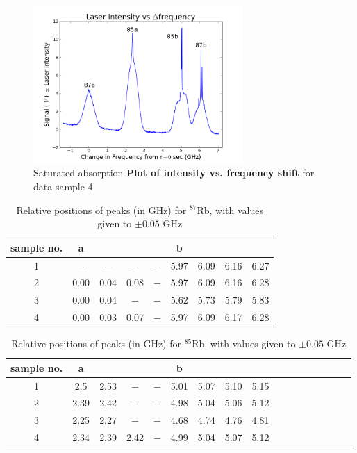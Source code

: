\documentclass[paper=a4, fontsize=11pt]{scrartcl} %
\numberwithin{equation}{section}
\numberwithin{figure}{section}
\numberwithin{table}{section}
\begin{document}
\begin{figure}[h] \begin{center}
  \includegraphics[height=60mm]{4-2-012.png}
  \caption{Saturated absorption \textbf{Plot of intensity vs. frequency shift}  for data sample 4. }
  \label{fig:scaled_4}
\end{center} \end{figure}

\begin{table}[h]
\centering
\caption{Relative positions of peaks (in GHz) for $^{87}$Rb, with values given to $\pm 0.05$ GHz}
\begin{tabular}{ c | c c c c | c c c c }
  \hline
  \hline
  sample no. & a & & & & b   \\
  \hline
  1 & $-$ & $-$ & $-$ & $-$ & 5.97 & 6.09 & 6.16 & 6.27 \\
  2 & 0.00 & 0.04 & 0.08 & $-$ & 5.97 & 6.09 & 6.16 & 6.28 \\
  3 & 0.00 & 0.04 & $-$ & $-$ & 5.62 & 5.73 & 5.79 & 5.83  \\
  4 & 0.00 & 0.03 & 0.07 & $-$ & 5.97 & 6.09 & 6.17 & 6.28
\end{tabular}
\label{table:relativePositions87}
\end{table}

\begin{table}[h]
\centering
\caption{Relative positions of peaks (in GHz) for $^{85}$Rb, with values given to $\pm 0.05$ GHz}
\begin{tabular}{ c | c c c c | c c c c | c c c c | c c c c }
  \hline
  \hline
  sample no. & a & & & & b  \\
  \hline
  1 & 2.5 & 2.53 & $-$ & $-$ & 5.01 & 5.07 & 5.10 & 5.15 \\
  2 & 2.39 & 2.42 & $-$ & $-$ & 4.98 & 5.04 & 5.06 & 5.12 \\
  3 & 2.25 & 2.27 & $-$ & $-$ & 4.68 & 4.74 & 4.76 & 4.81 \\
  4 & 2.34 & 2.39 & 2.42 & $-$ & 4.99 & 5.04 & 5.07 & 5.12 
\end{tabular}
\label{table:relativePositions85}
\end{table}
\end{document}
